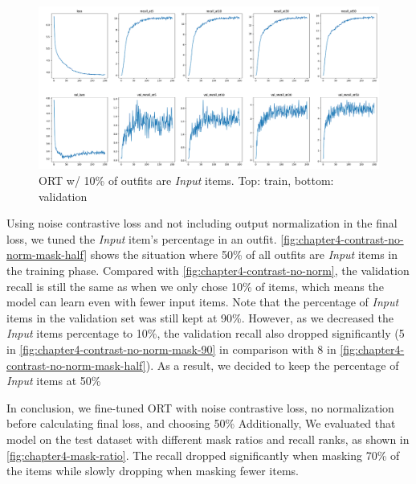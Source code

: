 \begin{figure}[ht!]
    \centering
\includegraphics[width=\linewidth]{content/resources/images/fashion-recommendation/chapter4-contrast-no-norm-mask-90.png}
    \caption{ORT w/ 10\% of outfits are \textit{Input} items. Top: train, bottom: validation}
    \label{fig:chapter4-contrast-no-norm-mask-90}
\end{figure}


Using noise contrastive loss and not including output normalization in the final loss, we tuned the \textit{Input} item's percentage in an outfit. \autoref{fig:chapter4-contrast-no-norm-mask-half} shows the situation where 50\% of all outfits are \textit{Input} items in the training phase. Compared with \autoref{fig:chapter4-contrast-no-norm}, the validation recall is still the same as when we only chose 10\% of items, which means the model can learn even with fewer input items. Note that the percentage of \textit{Input} items in the validation set was still kept at 90\%. However, as we decreased the \textit{Input} items percentage to 10\%, the validation recall also dropped significantly (5 in \autoref{fig:chapter4-contrast-no-norm-mask-90} in comparison with 8 in \autoref{fig:chapter4-contrast-no-norm-mask-half}). As a result, we decided to keep the percentage of \textit{Input} items at 50\% %

In conclusion, we fine-tuned ORT with noise contrastive loss, no normalization before calculating final loss, and choosing 50\% %
Additionally, We evaluated that model on the test dataset with different mask ratios and recall ranks, as shown in \autoref{fig:chapter4-mask-ratio}. The recall dropped significantly when masking 70\% of the items while slowly dropping when masking fewer items.

